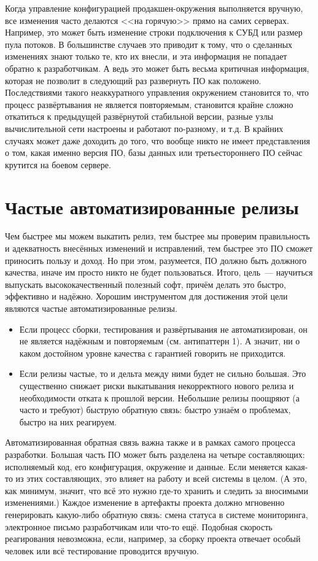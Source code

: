\documentclass{../../text-style}
\begin{document}
Когда управление конфигурацией продакшен-окружения выполняется вручную, все изменения часто делаются <<на горячую>> прямо на самих серверах. Например, это может быть изменение строки подключения к СУБД или размер пула потоков. В большинстве случаев это приводит к тому, что о сделанных изменениях знают только те, кто их внесли, и эта информация не попадает обратно к разработчикам. А ведь это может быть весьма критичная информация, которая не позволит в следующий раз развернуть ПО как положено. Последствиями такого неаккуратного управления окружением становится то, что процесс развёртывания не является повторяемым, становится крайне сложно откатиться к предыдущей развёрнутой стабильной версии, разные узлы вычислительной сети настроены и работают по-разному, и т.д. В крайних случаях может даже доходить до того, что вообще никто не имеет представления о том, какая именно версия ПО, базы данных или третьестороннего ПО сейчас крутится на боевом сервере.

\section{Частые автоматизированные релизы}

Чем быстрее мы можем выкатить релиз, тем быстрее мы проверим правильность и адекватность внесённых изменений и исправлений, тем быстрее это ПО сможет приносить пользу и доход. Но при этом, разумеется, ПО должно быть должного качества, иначе им просто никто не будет пользоваться. Итого, цель~--- научиться выпускать высококачественный полезный софт, причём делать это быстро, эффективно и надёжно. Хорошим инструментом для достижения этой цели являются частые автоматизированные релизы. 

\begin{itemize}
    \item Если процесс сборки, тестирования и развёртывания не автоматизирован, он не является надёжным и повторяемым (см. антипаттерн 1). А значит, ни о каком достойном уровне качества с гарантией говорить не приходится.
    \item Если релизы частые, то и дельта между ними будет не сильно большая. Это существенно снижает риски выкатывания некорректного нового релиза и необходимости отката к прошлой версии. Небольшие релизы поощряют (а часто и требуют) быструю обратную связь: быстро узнаём о проблемах, быстро на них реагируем.
\end{itemize}

Автоматизированная обратная связь важна также и в рамках самого процесса разработки. Большая часть ПО может быть разделена на четыре составляющих: исполняемый код, его конфигурация, окружение и данные. Если меняется какая-то из этих составляющих, это влияет на работу и всей системы в целом. (А это, как минимум, значит, что всё это нужно где-то хранить и следить за вносимыми изменениями.) Каждое изменение в артефакты проекта должно мгновенно генерировать какую-либо обратную связь: смена статуса в системе мониторинга, электронное письмо разработчикам или что-то ещё. Подобная скорость реагирования невозможна, если, например, за сборку проекта отвечает особый человек или всё тестирование проводится вручную.
\end{document}
